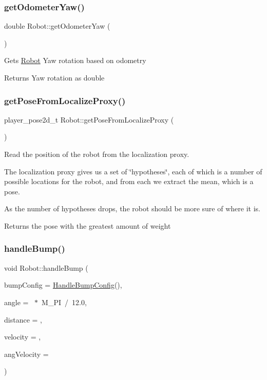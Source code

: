 \subsubsection{\texorpdfstring{get\+Odometer\+Yaw()}{getOdometerYaw()}}
{\footnotesize\ttfamily double Robot\+::get\+Odometer\+Yaw (\begin{DoxyParamCaption}{ }\end{DoxyParamCaption})}

Gets \hyperlink{classRobot}{Robot} Yaw rotation based on odometry \begin{DoxyReturn}{Returns}
Yaw rotation as double 
\end{DoxyReturn}
\mbox{\label{classRobot_ace17789169940f6780b0f21487adeb6b}} 
\subsubsection{\texorpdfstring{get\+Pose\+From\+Localize\+Proxy()}{getPoseFromLocalizeProxy()}}
{\footnotesize\ttfamily player\+\_\+pose2d\+\_\+t Robot\+::get\+Pose\+From\+Localize\+Proxy (\begin{DoxyParamCaption}{ }\end{DoxyParamCaption})}

Read the position of the robot from the localization proxy.

The localization proxy gives us a set of \char`\"{}hypotheses\char`\"{}, each of which is a number of possible locations for the robot, and from each we extract the mean, which is a pose.

As the number of hypotheses drops, the robot should be more sure of where it is.

\begin{DoxyReturn}{Returns}
the pose with the greatest amount of weight 
\end{DoxyReturn}
\mbox{\label{classRobot_a306de5cd4eb51303215da0c297cad8f4}} 
\subsubsection{\texorpdfstring{handle\+Bump()}{handleBump()}}
{\footnotesize\ttfamily void Robot\+::handle\+Bump (\begin{DoxyParamCaption}\item[{\hyperlink{structHandleBumpConfig}{Handle\+Bump\+Config}}]{bump\+Config = {\ttfamily \hyperlink{structHandleBumpConfig}{Handle\+Bump\+Config}()},  }\item[{double}]{angle = {~$\ast$~M\+\_\+PI~/~12.0},  }\item[{double}]{distance = {},  }\item[{double}]{velocity = {},  }\item[{double}]{ang\+Velocity = {} }\end{DoxyParamCaption})}

